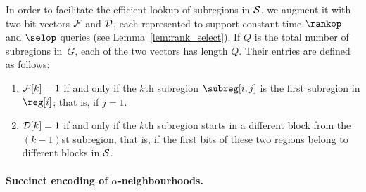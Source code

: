 {In order to facilitate the efficient lookup of subregions in $\mathcal{S}$, we augment
it with two bit vectors $\mathcal{F}$ and $\mathcal{D}$, each represented to support
constant-time $\rankop$ and $\selop$ queries (see Lemma~\ref{lem:rank_select}).
If $Q$ is the total number of subregions in~$G$, each of the two vectors has
length $Q$.
Their entries are defined as follows:
\begin{enumerate}
\item $\mathcal{F}[k] = 1$ if and only if the $k$th subregion $\subreg[i,j]$
  is the first subregion in $\reg[i]$; that is, if $j = 1$.
\item $\mathcal{D}[k] = 1$ if and only if the $k$th subregion starts in
  a different block from the $(k-1)$st subregion, that is, if
  the first bits of these two regions belong to different blocks in
  $\mathcal{S}$.
\end{enumerate}

\paragraph{\boldmath Succinct encoding of $\alpha$-neighbourhoods.}

}
